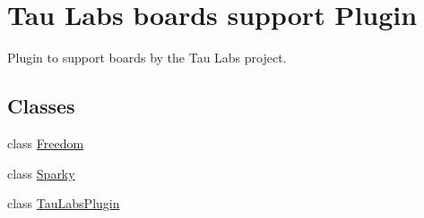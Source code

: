 \hypertarget{group___boards___tau_labs_plugin}{\section{\-Tau \-Labs boards support \-Plugin}
\label{group___boards___tau_labs_plugin}
}


\-Plugin to support boards by the \-Tau \-Labs project.  


\subsection*{\-Classes}
\begin{DoxyCompactItemize}
\item 
class \hyperlink{class_freedom}{\-Freedom}
\item 
class \hyperlink{class_sparky}{\-Sparky}
\item 
class \hyperlink{class_tau_labs_plugin}{\-Tau\-Labs\-Plugin}
\end{DoxyCompactItemize}
